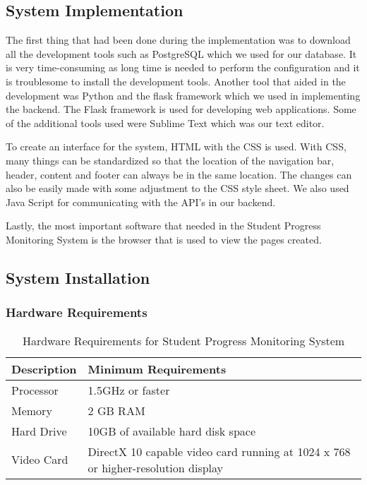 \documentclass{article}
\begin{document}
\subsection{System Implementation}
\par The first thing that had been done during the implementation was to download all the development tools such as PostgreSQL which we used for our database. It is very time-consuming as long time is needed to perform the configuration and it is troublesome to install the development tools. Another tool that aided in the development was Python and the flask framework  which we used in implementing the backend. The Flask framework  is used for developing web applications. Some of the additional tools used were Sublime Text which was our text editor.
\vspace*{5mm}
\par To create an interface for the system, HTML  with the CSS is used. With CSS, many things can be standardized so that the location of the navigation bar, header, content and footer can always be in the same location. The changes can also be easily made with some adjustment to the CSS style sheet. We also used Java Script for communicating with the API's in our backend.
\vspace*{5mm}
\par Lastly, the most important software that needed in the Student Progress Monitoring System is the
browser that is used to view the  pages created.
\subsection{System Installation}
\subsubsection{Hardware Requirements}
\begin{table}[h!]
\centering
\begin{tabular} {  | m{8cm} | m{6cm}| }
 \hline
 \textbf{Description} &  \textbf{Minimum Requirements}\\
 \hline
Processor & 1.5GHz or faster \\
\hline
 Memory & 2 GB RAM \\
\hline
Hard Drive & 10GB of available hard disk space \\
\hline
 Video Card & DirectX 10 capable video card running at 1024 x 768 or higher-resolution display  \\
\hline
\end{tabular}
\caption{Hardware Requirements for Student Progress Monitoring System}
\label{table:2}
\end{table}
\vspace*{1in}
\end{document}
